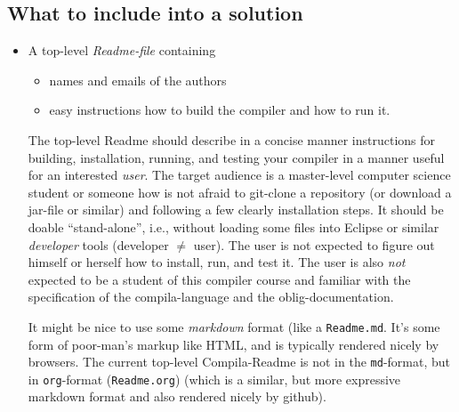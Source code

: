 \documentclass[10pt,freeform]{handout}[2014/08/13]
\begin{document}
\subsection{What to include into a solution}
\label{sec:what-include-into}


\begin{itemize}
\item A top-level \emph{Readme-file} containing
  \begin{itemize}
  \item names and emails of the authors
  \item easy instructions how to build the compiler and how to run it.
  \end{itemize}
  The top-level Readme should describe in a concise manner instructions for
  building, installation, running, and testing your compiler in a manner
  useful for an interested \emph{user}. The target audience is a
  master-level computer science student or someone how is not afraid to
  git-clone a repository (or download a jar-file or similar) and following
  a few clearly installation steps. It should be doable ``stand-alone'',
  i.e., without loading some files into Eclipse or similar \emph{developer}
  tools (developer $\not=$ user). The user is not expected to figure out
  himself or herself how to install, run, and test it. The user is also
  \emph{not} expected to be a student of this compiler course and familiar
  with the specification of the compila-language and the
  oblig-documentation.

  It might be nice to use some \emph{markdown} format (like a
  \texttt{Readme.md}. It's some form of poor-man's markup like HTML, and is
  typically rendered nicely by browsers. The current top-level
  Compila-Readme is not in the \texttt{md}-format, but in
  \texttt{org}-format (\texttt{Readme.org}) (which is a similar, but more
  expressive markdown format and also rendered nicely by github).
  

\end{itemize}
\end{document}
